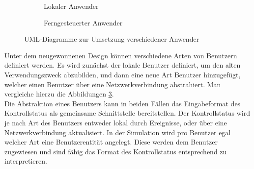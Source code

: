 \begin{figure}
\centering
\begin{subfigure}[b]{0.3\textwidth}
\centering
{}
\caption{Lokaler Anwender}
\label{fig:local}

\end{subfigure}
\begin{subfigure}[b]{0.3\textwidth}
\centering
{}
\caption{Ferngesteuerter Anwender}
\label{fig:remotecontrol_indiv}
\end{subfigure}
\caption{UML-Diagramme zur Umsetzung verschiedener Anwender}
\label{fig:remotecontrol_design}
\end{figure}

Unter dem neugewonnenen Design können verschiedene Arten von Benutzern definiert werden. Es wird zunächst der lokale Benutzer definiert, um den alten Verwendungszweck abzubilden, und dann eine neue Art Benutzer hinzugefügt, welcher einen Benutzer über eine Netzwerkverbindung abstrahiert. Man vergleiche hierzu die Abbildungen \ref{fig:remotecontrol_design}.\\
Die Abstraktion eines Benutzers kann in beiden Fällen das Eingabeformat des Kontrollstatus als gemeinsame Schnittstelle bereitstellen. Der Kontrollstatus wird je nach Art des Benutzers entweder lokal durch Ereignisse, oder über eine Netzwerkverbindung aktualisiert. 
In der Simulation wird pro Benutzer egal welcher Art eine Benutzerentität angelegt.
Diese werden dem Benutzer zugewiesen und sind fähig das Format des Kontrollstatus entsprechend zu interpretieren.
